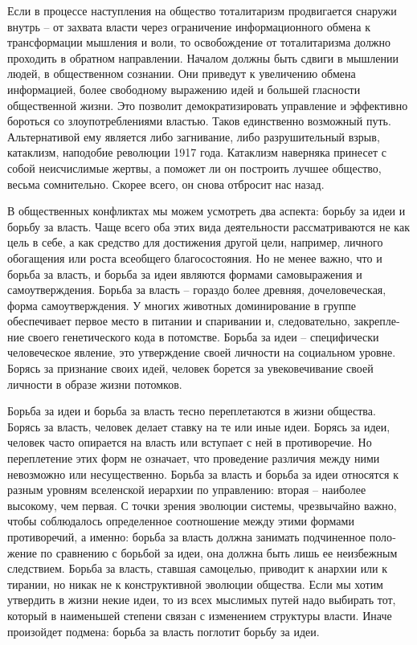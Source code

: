 \documentclass{book}
\begin{document}
Если в процессе наступления на общество тоталитаризм продвигается снаружи внутрь -- от захвата власти через огра­ничение информационного обмена к трансформации мышле­ния и воли, то освобождение от тоталитаризма должно прохо­дить в обратном направлении. Началом должны быть сдвиги в мышлении людей, в общественном сознании. Они приведут к увеличению обмена информацией, более свободному выра­жению идей и большей гласности общественной жизни. Это поз­волит демократизировать управление и эффективно бороться со злоупотреблениями властью. Таков единственно возможный путь. Альтернативой ему является либо загнивание, либо разрушительный взрыв, катаклизм, наподобие революции 1917 года. Катаклизм наверняка принесет с собой неисчислимые жертвы, а поможет ли он построить лучшее общество, весьма сомнительно. Скорее всего, он снова отбросит нас назад.

В общественных конфликтах мы можем усмотреть два ас­пекта: борьбу за идеи и борьбу за власть. Чаще всего оба этих вида деятельности рассматриваются не как цель в себе, а как средство для достижения другой цели, например, личного обогащения или роста всеобщего благосостояния. Но не менее важно, что и борьба за власть, и борьба за идеи являются формами самовыражения и самоутверждения. Борьба за власть -- гораздо более древняя, дочеловеческая, форма самоутверждения. У многих животных доминирование в группе обеспечивает пер­вое место в питании и спаривании и, следовательно, закрепле­ние своего генетического кода в потомстве. Борьба за идеи -- специфически человеческое явление, это утверждение своей личности на социальном уровне. Борясь за признание своих идей, человек борется за увековечивание своей личности в об­разе жизни потомков.

Борьба за идеи и борьба за власть тесно переплетаются в жиз­ни общества. Борясь за власть, человек делает ставку на те или иные идеи. Борясь за идеи, человек часто опирается на власть или вступает с ней в противоречие. Но переплетение этих форм не означает, что проведение различия между ними невозмож­но или несущественно. Борьба за власть и борьба за идеи отно­сятся к разным уровням вселенской иерархии по управлению:
вторая -- наиболее высокому, чем первая. С точки зрения эво­люции системы, чрез\-вы\-чай\-но важно, чтобы соблюдалось опреде­ленное соотношение между этими формами противоречий, а именно: борьба за власть должна занимать подчиненное поло­жение по сравнению с борьбой за идеи, она должна быть лишь ее неизбежным следствием. Борьба за власть, ставшая само­целью, приводит к анархии или к тирании, но никак не к кон­структивной эволюции общества. Если мы хотим утвердить в жизни некие идеи, то из всех мыслимых путей надо выбирать тот, который в наименьшей степени связан с изменением струк­туры власти. Иначе произойдет подмена: борьба за власть по­глотит борьбу за идеи.
\end{document}
